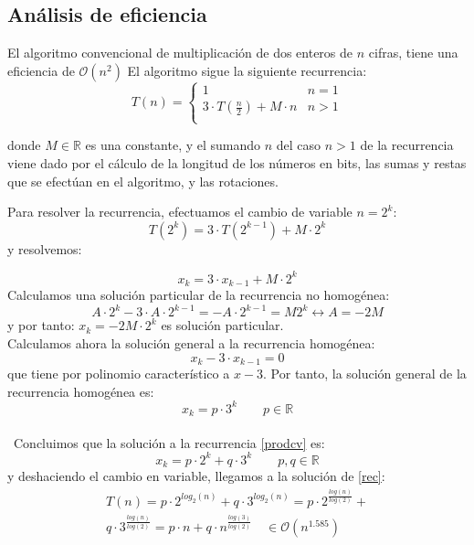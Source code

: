 \documentclass[a4paper, 11pt]{article} %
\begin{document}
\subsection{Análisis de eficiencia}
El algoritmo convencional de multiplicación de dos enteros de $n$ cifras, tiene una eficiencia de $\mathcal{O}(n^2)$
El algoritmo sigue la siguiente recurrencia:
\begin{equation}\label{rec}
 T(n)=\left\lbrace
	    \begin{array}{lr}
            1 & n=1\\
            3\cdot T\left(\frac{n}{2}\right) + M\cdot n & n>1\\
            \end{array}
	    \right.
\end{equation}

donde $M\in\mathbb{R}$ es una constante, y el sumando $n$ del caso $n>1$ de la recurrencia viene dado por el cálculo
de la longitud de los números en bits, las sumas y restas que se efectúan en el algoritmo, y las rotaciones.

Para resolver la recurrencia, efectuamos el cambio de variable $n=2^k$:
\begin{equation}\label{prodcv}
 T(2^k)=3\cdot T(2^{k-1}) + M\cdot 2^k
\end{equation}
y resolvemos: 

\begin{equation}
x_k=3\cdot x_{k-1}+M\cdot 2^k
\end{equation}
Calculamos una solución particular de la recurrencia no homogénea:
$$A\cdot 2^k - 3\cdot A \cdot 2^{k-1}=-A\cdot 2^{k-1}=M2^k \leftrightarrow A=-2M$$
y por tanto: $x_k=-2M \cdot 2^k$ es solución particular.\\
Calculamos ahora la solución general a la recurrencia homogénea:
$$ x_k-3\cdot x_{k-1}=0$$
que tiene por polinomio característico a $x-3$. Por tanto, la solución general de la
recurrencia homogénea es:
$$ x_k= p\cdot 3^k\qquad p\in\mathbb{R}$$
\\\
Concluimos que la solución a la recurrencia \ref{prodcv} es: 
\begin{equation}
x_k = p \cdot 2^k + q \cdot 3^k \qquad p,q \in \mathbb{R}
\end{equation}
y deshaciendo el cambio en variable, llegamos a la solución de \ref{rec}:
\begin{eqnarray*}
T(n)=p \cdot 2^{log_2(n)} + q \cdot 3^{log_2(n)} = p \cdot 2^{\frac{log(n)}{log(2)}} +\\
q \cdot 3^{\frac{log(n)}{log(2)}}=p \cdot n + q \cdot n^{\frac{log(3)}{log(2)}} \quad \in \mathcal{O}(n^{1.585})
\end{eqnarray*}
\end{document}
